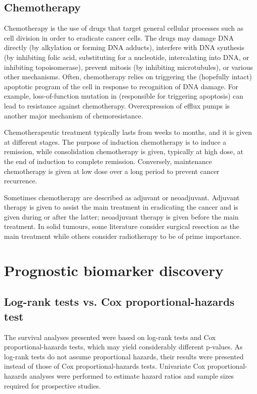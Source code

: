 \subsection{Chemotherapy}

Chemotherapy is the use of drugs that target general cellular processes such as cell division in order to eradicate cancer cells. The drugs may damage DNA directly (by alkylation or forming DNA adducts), interfere with DNA synthesis (by inhibiting folic acid, substituting for a nucleotide, intercalating into DNA, or inhibiting topoisomerase), prevent mitosis (by inhibiting microtubules), or various other mechanisms. Often, chemotherapy relies on triggering the (hopefully intact) apoptotic program of the cell in response to recognition of DNA damage. For example, loss-of-function mutation in  (responsible for triggering apoptosis) can lead to resistance against chemotherapy. Overexpression of efflux pumps is another major mechanism of chemoresistance.

Chemotherapeutic treatment typically lasts from weeks to months, and it is given at different stages. The purpose of induction chemotherapy is to induce a remission, while consolidation chemotherapy is given, typically at high dose, at the end of induction to complete remission. Conversely, maintenance chemotherapy is given at low dose over a long period to prevent cancer recurrence.

Sometimes chemotherapy are described as adjuvant or neoadjuvant. Adjuvant therapy is given to assist the main treatment in eradicating the cancer and is given during or after the latter; neoadjuvant therapy is given before the main treatment. In solid tumours, some literature consider surgical resection as the main treatment while others consider radiotherapy to be of prime importance.


\section{Prognostic biomarker discovery}
\label{sec:prognostication}

\subsection{Log-rank tests vs. Cox proportional-hazards test}

The survival analyses presented were based on log-rank tests and Cox proportional-hazards tests, which may yield considerably different p-values. As log-rank tests do not assume proportional hazards, their results were presented instead of those of Cox proportional-hazards tests. Univariate Cox proportional-hazards analyses were performed to estimate hazard ratios and sample sizes required for prospective studies.

